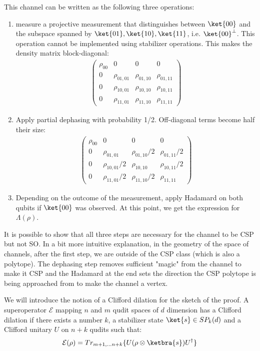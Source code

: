 This channel can be written as the following three operations:
\begin{enumerate}
\item  measure a projective measurement that distinguishes between $\ket{00}$ and the subspace spanned by $\ket{01},\ket{10},\ket{11}$, i.e. $\ket{00}^\perp$. This operation cannot be implemented using stabilizer operations. This makes the density matrix block-diagonal: 
\begin{align}
\begin{pmatrix}
\rho_{00} & 0 & 0 & 0 \\
0 & \rho_{01,01} & \rho_{01,10} & \rho_{01,11} \\
0 & \rho_{10,01} & \rho_{10,10} & \rho_{10,11} \\
0 & \rho_{11,01} & \rho_{11,10} & \rho_{11,11} 
\end{pmatrix}
\end{align}
\item Apply partial dephasing with probability 1/2. Off-diagonal terms become half their size: 
\begin{align}
\begin{pmatrix}
\rho_{00} & 0 & 0 & 0 \\
0 & \rho_{01,01} & \rho_{01,10}/2 & \rho_{01,11}/2 \\
0 & \rho_{10,01}/2 & \rho_{10,10} & \rho_{10,11}/2 \\
0 & \rho_{11,01}/2 & \rho_{11,10}/2 & \rho_{11,11} 
\end{pmatrix}
\end{align}
\item Depending on the outcome of the measurement, apply Hadamard on both qubits if $\ket{00}$ was observed. At this point, we get the expression for $\Lambda(\rho)$. 
\end{enumerate}

It is possible to show that all three steps are necessary for the channel to be CSP but not SO. In a bit more intuitive explanation, in the geometry of the space of channels, after the first step, we are outside of the CSP class (which is also a polytope). The dephasing step removes sufficient "magic" from the channel to make it CSP and the Hadamard at the end sets the direction the CSP polytope is being approached from to make the channel a vertex. 

We will introduce the notion of a Clifford dilation for the sketch of the proof. 
A superoperator $\mathcal{E}$ mapping $n$ and $m$ qudit spaces of $d$ dimension has a Clifford dilation if there exists a number $k$, a stabilizer state $\ket{s} \in SP_k(d)$ and a Clifford unitary $U$ on $n+k$ qudits such that: 
$$
\mathcal{E}(\rho) = Tr_{m+1,...n+k}\{U(\rho \otimes \ketbra{s})U^\dagger\}
$$

